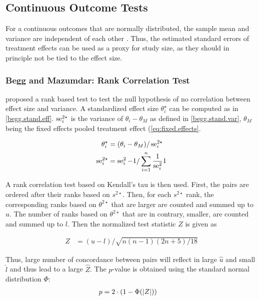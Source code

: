 \documentclass[11pt,a4paper,twoside]{book}\usepackage[]{graphicx}\usepackage[]{color}
\begin{document}
\subsection{Continuous Outcome Tests}
For a continuous outcomes that are normally distributed, the sample mean and variance are independent of each other \cite[120]{meta.w.R}. Thus, the estimated standard errors of treatment effects can be used as a proxy for study size, as they should in principle not be tied to the effect size.

\subsubsection{Begg and Mazumdar: Rank Correlation Test} \label{sec:Begg}
\citet{begg.ties} proposed a rank based test to test the null hypothesis of no correlation between effect size and variance.
A standardized effect size $\theta_i^\star$ can be computed as in \ref{begg.stand.eff}. $\operatorname{se}_i^{2\star}$ is the variance of $\theta_i - \theta_M$ as defined in \ref{begg.stand.var}, $\theta_M$ being the fixed effects pooled treatment effect (\ref{eq:fixed.effects}. 

\begin{align}
\theta_i^\star &= (\theta_i - \theta_M)/\operatorname{se}_i^{2\star} \label{begg.stand.eff}  \\
\operatorname{se}_i^{2\star} &= \operatorname{se}_i^2 - 1/\sum_{i = 1}^n\frac{1}{\operatorname{se}_i^2}1 \label{begg.stand.var} 
\end{align}

A rank correlation test based on Kendall's tau is then used. First, the pairs are ordered after their ranks based on $s^{2\star}$. Then, for each $s^{2\star}$ rank, the corresponding ranks based on $\theta^{2\star}$ that are larger are counted and summed up to $u$. The number of ranks based on $\theta^{2\star}$ that are in contrary, smaller, are counted and summed up to $l$. Then the normalized test statistic $Z$ is given as

\begin{align}
Z &= (u - l)/\sqrt{n(n-1)(2n + 5)/18} \nonumber
\end{align}

Thus, large number of concordance between pairs will reflect in large $\hat{u}$ and small $\hat{l}$ and thus lead to a large $\hat{Z}$. The $p$-value is obtained using the standard normal distribution $\Phi$:
\begin{align}
p &= 2\cdot(1-\Phi(\left\lvert Z\right\rvert)) \nonumber
\end{align}
\end{document}
